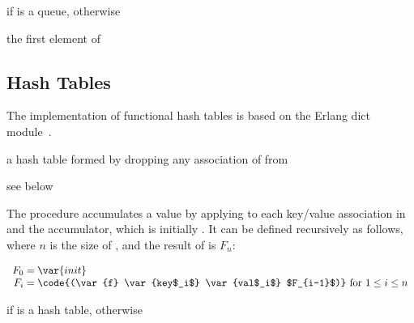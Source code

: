 \begin{procedure}
\end{procedure}
\returns{}  if  is a queue,  otherwise

\begin{procedure}
\end{procedure}
\returns{} the first element of 

\subsection{Hash Tables}

The implementation of functional hash tables is based on the Erlang
dict module~\cite{dict-ref,dynamic-hashing}.

\begin{procedure}
\end{procedure}
\returns{} a hash table formed by dropping any association of
 from 

\begin{procedure}
\end{procedure}
\returns{} see below

The  procedure accumulates a value by applying 
to each key/value association in  and the accumulator, which
is initially . It can be defined recursively as follows,
where $n$ is the size of , and the result of 
is $F_n$:

$$\begin{array}{r@{\;=\;}l}
F_0 & \var{init}\\
F_i & \code{(\var{f} \var{key$_i$} \var{val$_i$} $F_{i-1}$)}
\hbox{ for $1 \le i \le n$}\\
\end{array}$$

\begin{procedure}
\end{procedure}
\returns{}  if  is a hash table, 
otherwise


